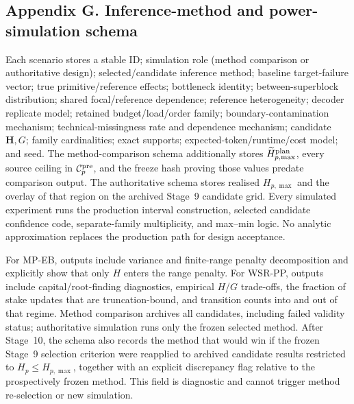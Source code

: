 \documentclass[11pt,a4paper]{article}
\begin{document}
\subsection*{Appendix G. Inference-method and power-simulation schema}
Each scenario stores a stable ID; simulation role (method comparison or authoritative design); selected/candidate inference method; baseline target-failure vector; true primitive/reference effects; bottleneck identity; between-superblock distribution; shared focal/reference dependence; reference heterogeneity; decoder replicate model; retained budget/load/order family; boundary-contamination mechanism; technical-missingness rate and dependence mechanism; candidate $\mathbf H,G$; family cardinalities; exact supports; expected-token/runtime/cost model; and seed. The method-comparison schema additionally stores $\widetilde H_{p,\max}^{\rm plan}$, every source ceiling in $\mathcal C_p^{\rm pre}$, and the freeze hash proving those values predate comparison output. The authoritative schema stores realised $H_{p,\max}$ and the overlay of that region on the archived Stage~9 candidate grid. Every simulated experiment runs the production interval construction, selected candidate confidence code, separate-family multiplicity, and max--min logic. No analytic approximation replaces the production path for design acceptance.

For MP-EB, outputs include variance and finite-range penalty decomposition and explicitly show that only $H$ enters the range penalty. For WSR-PP, outputs include capital/root-finding diagnostics, empirical $H$/$G$ trade-offs, the fraction of stake updates that are truncation-bound, and transition counts into and out of that regime. Method comparison archives all candidates, including failed validity status; authoritative simulation runs only the frozen selected method. After Stage~10, the schema also records the method that would win if the frozen Stage~9 selection criterion were reapplied to archived candidate results restricted to $H_p\le H_{p,\max}$, together with an explicit discrepancy flag relative to the prospectively frozen method. This field is diagnostic and cannot trigger method re-selection or new simulation.
\end{document}

